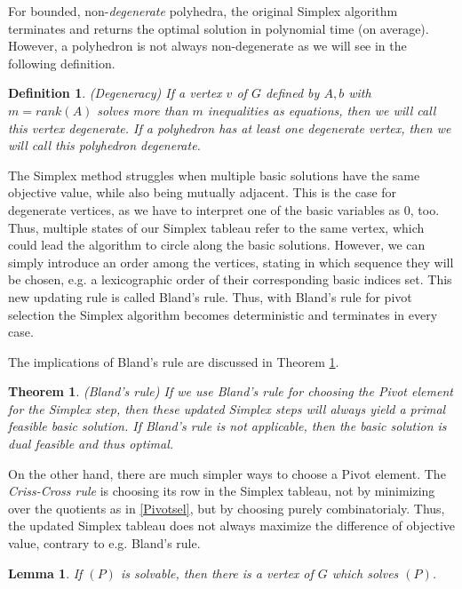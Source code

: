 \documentclass[a4paper, 11pt]{article}
\newtheorem{mydef}{Definition}
\newtheorem{lemma}{Lemma}
\newtheorem{theorem}{Theorem}
\begin{document}
For bounded, non-\textit{degenerate} polyhedra, the original Simplex algorithm terminates and returns the optimal solution in polynomial time (on average). However, a polyhedron is not always non-degenerate as we will see in the following definition.

\begin{mydef}(Degeneracy)\medskip 
	If a vertex $v$ of $G$ defined by $A,b$ with $m=rank(A)$ solves more than $m$ inequalities as equations, then we will call this vertex \emph{degenerate}. \medskip
	If a polyhedron has at least one degenerate vertex, then we will call this polyhedron \emph{degenerate}.
\end{mydef}

The Simplex method struggles when multiple basic solutions have the same objective value, while also being mutually adjacent. This is the case for degenerate vertices, as we have to interpret one of the basic variables as $0$, too. Thus, multiple states of our Simplex tableau refer to the same vertex, which could lead the algorithm to circle along the basic solutions. However, we can simply introduce an order among the vertices, stating in which sequence they will be chosen, e.g. a lexicographic order of their corresponding basic indices set. This new updating rule is called Bland's rule. Thus, with Bland's rule for pivot selection the Simplex algorithm becomes deterministic and terminates in every case.\medskip

The implications of Bland's rule are discussed in Theorem \ref{Bland}.

\begin{theorem}(Bland's rule)\medskip
	\label{Bland}
	If we use Bland's rule for choosing the Pivot element for the Simplex step, then these updated Simplex steps will always yield a primal feasible basic solution. If Bland's rule is not applicable, then the basic solution is dual feasible and thus optimal.
\end{theorem}

On the other hand, there are much simpler ways to choose a Pivot element. The \textit{Criss-Cross rule} is choosing its row in the Simplex tableau, not by minimizing over the quotients as in \ref{Pivotsel}, but by choosing purely combinatorialy. Thus, the updated Simplex tableau does not always maximize the difference of objective value, contrary to e.g. Bland's rule. 

\begin{lemma}
	\label{theo4}
	If $(P)$ is solvable, then there is a vertex of $G$ which solves $(P)$.
\end{lemma}
\end{document}
